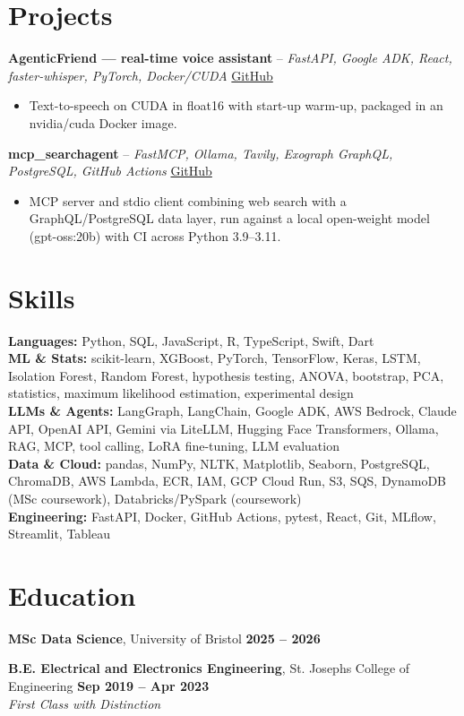 \documentclass[a4paper,10pt]{article}
\begin{document}
\section{Projects}
\noindent\textbf{AgenticFriend — real-time voice assistant} -- \textit{FastAPI, Google ADK, React, faster-whisper, PyTorch, Docker/CUDA} \hfill \href{https://github.com/Thiruvel-AP/adk_multi-agent}{GitHub}
\begin{itemize}
  \item Text-to-speech on CUDA in float16 with start-up warm-up, packaged in an nvidia/cuda Docker image.
\end{itemize}
\noindent\textbf{mcp\_searchagent} -- \textit{FastMCP, Ollama, Tavily, Exograph GraphQL, PostgreSQL, GitHub Actions} \hfill \href{https://github.com/Thiruvel-AP/mcp_searchagent}{GitHub}
\begin{itemize}
  \item MCP server and stdio client combining web search with a GraphQL/PostgreSQL data layer, run against a local open-weight model (gpt-oss:20b) with CI across Python 3.9–3.11.
\end{itemize}

\section{Skills}
\textbf{Languages:} Python, SQL, JavaScript, R, TypeScript, Swift, Dart\\
\textbf{ML \& Stats:} scikit-learn, XGBoost, PyTorch, TensorFlow, Keras, LSTM, Isolation Forest, Random Forest, hypothesis testing, ANOVA, bootstrap, PCA, statistics, maximum likelihood estimation, experimental design\\
\textbf{LLMs \& Agents:} LangGraph, LangChain, Google ADK, AWS Bedrock, Claude API, OpenAI API, Gemini via LiteLLM, Hugging Face Transformers, Ollama, RAG, MCP, tool calling, LoRA fine-tuning, LLM evaluation\\
\textbf{Data \& Cloud:} pandas, NumPy, NLTK, Matplotlib, Seaborn, PostgreSQL, ChromaDB, AWS Lambda, ECR, IAM, GCP Cloud Run, S3, SQS, DynamoDB (MSc coursework), Databricks/PySpark (coursework)\\
\textbf{Engineering:} FastAPI, Docker, GitHub Actions, pytest, React, Git, MLflow, Streamlit, Tableau

\section{Education}
\textbf{MSc Data Science}, University of Bristol \hfill \textbf{2025 – 2026}\par
\vspace{2pt}
\textbf{B.E. Electrical and Electronics Engineering}, St. Joseph\textquotesingle{}s College of Engineering \hfill \textbf{Sep 2019 – Apr 2023}\\ \textit{First Class with Distinction}\par
\end{document}
